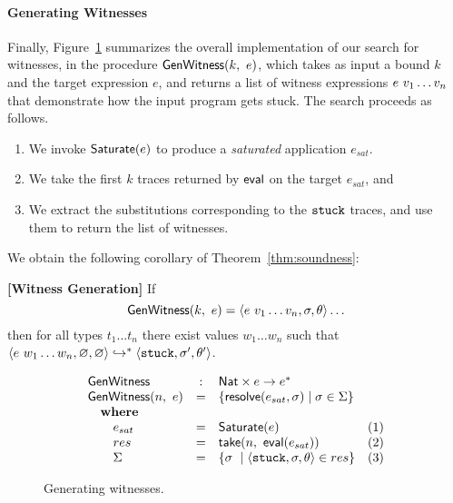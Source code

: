 \paragraph{Generating Witnesses}
%
Finally, Figure~\ref{fig:algo-gen-witness} summarizes the overall
implementation of our search for witnesses, in the procedure
$\mathsf{GenWitness}(k,\ e)$, which takes as input a bound $k$ and the
target expression $e$, and returns a list of witness expressions
$e\ v_1 \ldots v_n$ that demonstrate how the input program
gets stuck.
%
The search proceeds as follows.
%
\begin{enumerate}
  \item We invoke $\mathsf{Saturate}(e)$ to produce a \emph{saturated}
        application $e_{sat}$.

  \item We take the first $k$ traces returned by $\mathsf{eval}$
        on the target $e_{sat}$, and

  \item We extract the substitutions corresponding to the
        $\mathtt{stuck}$ traces, and use them to return the list
        of witnesses.
\end{enumerate}
%
We obtain the following corollary of Theorem~\ref{thm:soundness}:

\begin{cor}{\textbf{[Witness Generation]}}
\label{thm:generation}
  If $$\mathsf{GenWitness}(k,\ e) = \langle e\ v_1 \ldots v_n, \sigma, \theta \rangle\ldots$$
  then for all types $t_1 \ldots t_n$ there exist values $w_1 \ldots w_n$ such that
  $\langle e\ w_1 \ldots w_n, \varnothing, \varnothing \rangle \hookrightarrow^{*} \langle \mathtt{stuck}, \sigma', \theta' \rangle{}$.
\end{cor}

\begin{figure}[t]
\centering
$$
\begin{array}{lclr}
\mathsf{GenWitness}       & : & \mathsf{Nat} \times e \rightarrow e^{*} & \\
\mathsf{GenWitness}(n,\ e)  & = & \{ \mathsf{resolve}(e_{sat}, \sigma) \mid \sigma \in \Sigma \} & \\
\quad \mbox{\textbf{where}} &    & & \\
\quad \quad e_{sat} & = & \mathsf{Saturate}(e) & (1) \\
\quad \quad res    & = & \mathsf{take}(n,\ \mathsf{eval}(e_{sat})) & (2) \\
\quad \quad \Sigma & = & \{ \sigma\ \mid \langle \mathtt{stuck}, \sigma, \theta \rangle \in res\} & (3)
\end{array}
$$
\caption{Generating witnesses.}
\label{fig:algo-gen-witness}
\end{figure}

